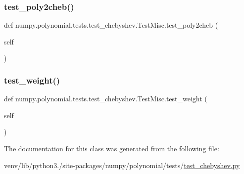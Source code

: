 \subsubsection{\texorpdfstring{test\+\_\+poly2cheb()}{test\_poly2cheb()}}
{\footnotesize\ttfamily def numpy.\+polynomial.\+tests.\+test\+\_\+chebyshev.\+Test\+Misc.\+test\+\_\+poly2cheb (\begin{DoxyParamCaption}\item[{}]{self }\end{DoxyParamCaption})}

\mbox{\label{classnumpy_1_1polynomial_1_1tests_1_1test__chebyshev_1_1TestMisc_af914d4592f8e554fa2d02b68ebdb50e4}} 
\subsubsection{\texorpdfstring{test\+\_\+weight()}{test\_weight()}}
{\footnotesize\ttfamily def numpy.\+polynomial.\+tests.\+test\+\_\+chebyshev.\+Test\+Misc.\+test\+\_\+weight (\begin{DoxyParamCaption}\item[{}]{self }\end{DoxyParamCaption})}



The documentation for this class was generated from the following file\+:\begin{DoxyCompactItemize}
\item 
venv/lib/python3./site-\/packages/numpy/polynomial/tests/\hyperlink{test__chebyshev_8py}{test\+\_\+chebyshev.\+py}\end{DoxyCompactItemize}
